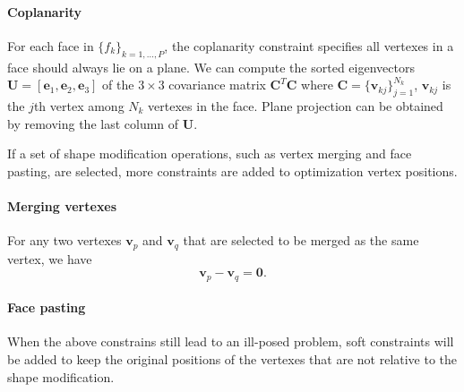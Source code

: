 \paragraph{Coplanarity} {For each face in  $\{f_k\}_{k=1,\dots,P}$, the coplanarity constraint specifies all vertexes in a face should always lie on a plane. 
We can compute the sorted eigenvectors $\mathbf{U} = [\mathbf{e}_1, \mathbf{e}_2, \mathbf{e}_3]$ of the $ 3 \times 3$ covariance matrix $\mathbf{C}^T\mathbf{C}$ where $\mathbf{C} = \{\mathbf{v}_{kj}\}_{j=1}^{N_k}$, $\mathbf{v}_{kj}$ is the $j$th vertex among $N_k$ vertexes in the face. Plane projection can be obtained by removing the last column of $\mathbf{U}$. 


If a set of shape modification operations, such as vertex merging and face pasting, are selected, more constraints are added to optimization vertex positions. 
%

\paragraph{Merging vertexes} 
For any two vertexes $\mathbf{v}_p$ and $\mathbf{v}_q$ that are selected to be merged as the same vertex, we have 
\begin{equation}
\mathbf{v}_p - \mathbf{v}_q = \mathbf{0}.
\label{equ:point}
\end{equation}

\paragraph{Face pasting} 
{\color{blue}{If two faces $f_a$ and $f_b$ need to snap together, the whole vertexes of these two faces should satisfy coplanarity constrain.}}


When the above constrains still lead to an ill-posed problem, soft constraints will be added to keep the original positions of the vertexes that are not relative to the shape modification. 

}
